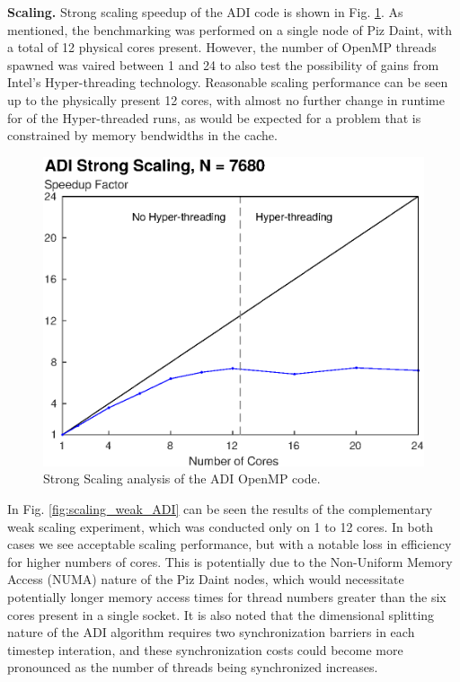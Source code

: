 \documentclass[letterpaper]{article}
\newcommand{\mypar}[1]{{\bf #1.}}
\begin{document}
\mypar{Scaling}
Strong scaling speedup of the ADI code is shown in Fig. \ref{fig:scaling_strong_ADI}. As mentioned, the benchmarking was performed on a single node of Piz Daint, with a total of 12 physical cores present. However, the number of OpenMP threads spawned was vaired between 1 and 24 to also test the possibility of gains from Intel's Hyper-threading technology. Reasonable scaling performance can be seen up to the physically present 12 cores, with almost no further change in runtime for of the Hyper-threaded runs, as would be expected for a problem that is constrained by memory bendwidths in the cache.

\begin{figure}\centering
  \includegraphics[width=\linewidth]{./plots/scaling_strong_ADI.eps}
  \caption{Strong Scaling analysis of the ADI OpenMP code.}
  \label{fig:scaling_strong_ADI}
\end{figure}

In Fig. \ref{fig:scaling_weak_ADI} can be seen the results of the complementary weak scaling experiment, which was conducted only on 1 to 12 cores. In both cases we see acceptable scaling performance, but with a notable loss in efficiency for higher numbers of cores. This is potentially due to the Non-Uniform Memory Access (NUMA) nature of the Piz Daint nodes, which would necessitate potentially longer memory access times for thread numbers greater than the six cores present in a single socket. It is also noted that the dimensional splitting nature of the ADI algorithm requires two synchronization barriers in each timestep interation, and these synchronization costs could become more pronounced as the number of threads being synchronized increases.
\end{document}
